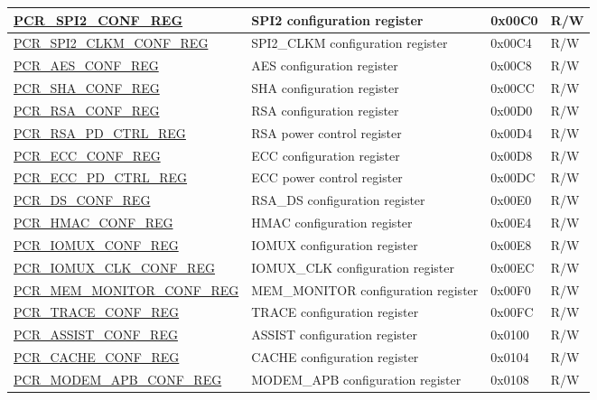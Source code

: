 \begin{longtable}{ | p{6cm} | p{7.2cm} | p{1.3cm} | p{1cm} | }
\hyperref[regdesc:PCRSPI2CONFREG]{PCR\_SPI2\_CONF\_REG} & SPI2 configuration register & 0x00C0 & R/W \\ \hline
\hyperref[regdesc:PCRSPI2CLKMCONFREG]{PCR\_SPI2\_CLKM\_CONF\_REG} & SPI2\_CLKM configuration register & 0x00C4 & R/W \\ \hline
\hyperref[regdesc:PCRAESCONFREG]{PCR\_AES\_CONF\_REG} & AES configuration register & 0x00C8 & R/W \\ \hline
\hyperref[regdesc:PCRSHACONFREG]{PCR\_SHA\_CONF\_REG} & SHA configuration register & 0x00CC & R/W \\ \hline
\hyperref[regdesc:PCRRSACONFREG]{PCR\_RSA\_CONF\_REG} & RSA configuration register & 0x00D0 & R/W \\ \hline
\hyperref[regdesc:PCRRSAPDCTRLREG]{PCR\_RSA\_PD\_CTRL\_REG} & RSA power control register & 0x00D4 & R/W \\ \hline
\hyperref[regdesc:PCRECCCONFREG]{PCR\_ECC\_CONF\_REG} & ECC configuration register & 0x00D8 & R/W \\ \hline
\hyperref[regdesc:PCRECCPDCTRLREG]{PCR\_ECC\_PD\_CTRL\_REG} & ECC power control register & 0x00DC & R/W \\ \hline
\hyperref[regdesc:PCRDSCONFREG]{PCR\_DS\_CONF\_REG} & RSA\_DS configuration register & 0x00E0 & R/W \\ \hline
\hyperref[regdesc:PCRHMACCONFREG]{PCR\_HMAC\_CONF\_REG} & HMAC configuration register & 0x00E4 & R/W \\ \hline
\hyperref[regdesc:PCRIOMUXCONFREG]{PCR\_IOMUX\_CONF\_REG} & IOMUX configuration register & 0x00E8 & R/W \\ \hline
\hyperref[regdesc:PCRIOMUXCLKCONFREG]{PCR\_IOMUX\_CLK\_CONF\_REG} & IOMUX\_CLK configuration register & 0x00EC & R/W \\ \hline
\hyperref[regdesc:PCRMEMMONITORCONFREG]{PCR\_MEM\_MONITOR\_CONF\_REG} & MEM\_MONITOR configuration register & 0x00F0 & R/W \\ \hline
\hyperref[regdesc:PCRTRACECONFREG]{PCR\_TRACE\_CONF\_REG} & TRACE configuration register & 0x00FC & R/W \\ \hline
\hyperref[regdesc:PCRASSISTCONFREG]{PCR\_ASSIST\_CONF\_REG} & ASSIST configuration register & 0x0100 & R/W \\ \hline
\hyperref[regdesc:PCRCACHECONFREG]{PCR\_CACHE\_CONF\_REG} & CACHE configuration register & 0x0104 & R/W \\ \hline
\hyperref[regdesc:PCRMODEMAPBCONFREG]{PCR\_MODEM\_APB\_CONF\_REG} & MODEM\_APB configuration register & 0x0108 & R/W \\ \hline

\end{longtable}
